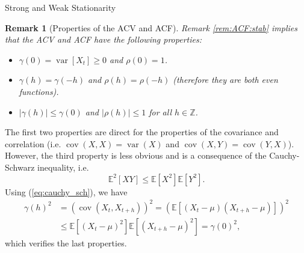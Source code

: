 \documentclass[envcountsect,usenames,dvipsnames]{beamer}
\DeclareMathOperator*{\cov}{cov}
\DeclareMathOperator*{\var}{var}
\theoremstyle{mystyle}
\newtheorem{Remark}{Remark}
\begin{document}
  \begin{frame}{Strong and Weak Stationarity}
	\footnotesize  
	
\begin{Remark}[Properties of the ACV and ACF]
Remark \ref{rem:ACF:stab} implies that the ACV and ACF have the following properties:
    \begin{itemize}
			\item $\gamma(0) = \var \left[X_t\right] \geq 0$ and $\rho(0) = 1$.
			\item $\gamma(h) = \gamma(-h)$ and $\rho(h) = \rho(-h)$ (therefore they are both even functions).
			\item $|\gamma(h)|  \leq \gamma(0)$ and $|\rho(h)|  \leq 1 $ for all $ h\in \mathbb{Z}$.
			\end{itemize}
		\end{Remark}	

The first two properties are direct for the properties of the covariance and correlation (i.e. $\cov(X,X) = \var(X)$ and $\cov(X,Y) = \cov(Y,X)$). However, the third property is less obvious and is a consequence of the Cauchy-Schwarz inequality, i.e.
%
\begin{equation}
    \label{eq:cauchy_sch}
     \mathbb{E}^2\left[XY\right] \leq \mathbb{E}\left[X^2\right] \mathbb{E}\left[Y^2\right].
\end{equation}
%
Using (\ref{eq:cauchy_sch}), we have
%
\begin{equation*}
    \begin{aligned}
             \gamma(h)^2 &= \left(\cov\left(X_t, X_{t+h}\right)\right)^2 = \left( \mathbb{E}\left[\left(X_t - \mu\right)\left(X_{t+h} - \mu\right)\right] \right)^2\\
             &\leq \mathbb{E}\left[\left(X_t - \mu\right)^2\right] \mathbb{E}\left[\left(X_{t+h} - \mu\right)^2\right] = \gamma(0)^2,
    \end{aligned}
\end{equation*}
%
which verifies the last properties.
\end{frame}
\end{document}
